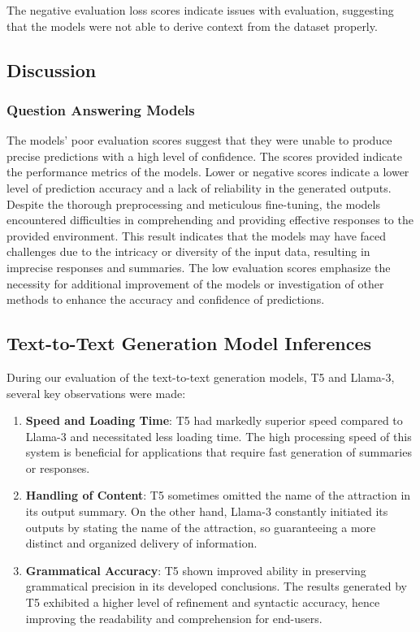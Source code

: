 \documentclass[conference]{IEEEtran}
\begin{document}
    The negative evaluation loss scores indicate issues with evaluation, suggesting that the models were not able to derive context from the dataset properly.

    \subsection{Discussion}

        \subsubsection{Question Answering Models}

            The models' poor evaluation scores suggest that they were unable to produce precise predictions with a high level of confidence. The scores provided indicate the performance metrics of the models. Lower or negative scores indicate a lower level of prediction accuracy and a lack of reliability in the generated outputs. Despite the thorough preprocessing and meticulous fine-tuning, the models encountered difficulties in comprehending and providing effective responses to the provided environment. This result indicates that the models may have faced challenges due to the intricacy or diversity of the input data, resulting in imprecise responses and summaries. The low evaluation scores emphasize the necessity for additional improvement of the models or investigation of other methods to enhance the accuracy and confidence of predictions.

        \subsection{Text-to-Text Generation Model Inferences}

        During our evaluation of the text-to-text generation models, T5 and Llama-3, several key observations were made:

        \begin{enumerate}
            \item \textbf{Speed and Loading Time}:
            T5 had markedly superior speed compared to Llama-3 and necessitated less loading time. The high processing speed of this system is beneficial for applications that require fast generation of summaries or responses.
            
            \item \textbf{Handling of Content}:
            T5 sometimes omitted the name of the attraction in its output summary. On the other hand, Llama-3 constantly initiated its outputs by stating the name of the attraction, so guaranteeing a more distinct and organized delivery of information.
            
            \item \textbf{Grammatical Accuracy}:
            T5 shown improved ability in preserving grammatical precision in its developed conclusions. The results generated by T5 exhibited a higher level of refinement and syntactic accuracy, hence improving the readability and comprehension for end-users.
        
        \end{enumerate}
\end{document}
